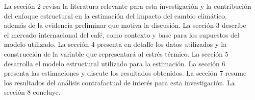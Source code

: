 La sección 2 revisa la literatura relevante para esta investigación y la contribución del enfoque estructural en la estimación del impacto del cambio climático, además de la evidencia preliminar que motiva la discusión. La sección 3 describe el mercado internacional del café, como contexto y base para los supuestos del modelo utilizado. La sección 4 presenta en detalle los datos utilizados y la construcción de la variable que representará al estrés térmico. La sección 5 desarrolla el modelo estructural utilizado para la estimación. La sección 6 presenta las estimaciones y discute los resultados obtenidos. La sección 7 resume los resultados del análisis contrafactual de interés para esta investigación. La sección 8 concluye.